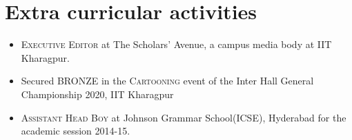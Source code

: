 \documentclass[a4paper,10pt]{article}
\begin{document}
\section{Extra curricular activities}
\small
\begin{itemize}
	\item{\textsc{Executive Editor} at The Scholars' Avenue, a campus media body at IIT Kharagpur.}
	\item{Secured \textsc{BRONZE} in the \textsc{Cartooning} event of  the Inter Hall General Championship 2020, IIT Kharagpur}	
	\item{\textsc{Assistant Head Boy} at Johnson Grammar School(ICSE), Hyderabad for the academic session 2014-15}.
\end{itemize}
\end{document}

